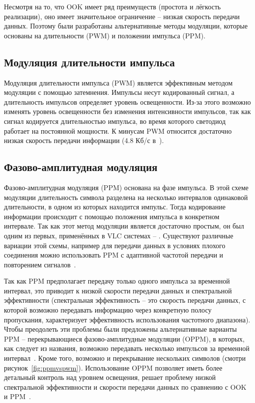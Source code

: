 Несмотря на то, что OOK имеет ряд преимуществ (простота и лёгкость реализации), оно имеет значительное ограничение \--- низкая скорость передачи данных. Поэтому были разработаны альтернативные методы модуляции, которые основаны на длительности (PWM) и положении импульса (PPM). 

\subsection{Модуляция длительности импульса}
\label{PWM}

Модуляция длительности импульса (PWM) является эффективным методом модуляции с помощью затемнения. Импульсы несут кодированный сигнал, а длительность импульсов определяет уровень освещенности. Из-за этого возможно изменять уровень освещенности без изменения интенсивности импульсов, так как сигнал кодируется длительностью импульса, во время которого светодиод работает на постоянной мощности. К минусам PWM относится достаточно низкая скорость передачи информации (4.8 Кб/с в~\cite{Sugiyama2007}).

\subsection{Фазово-амплитудная модуляция}

Фазово-амплитудная модуляция (PPM) основана на фазе импульса. В этой схеме модуляции длительность символа разделена на несколько интервалов одинаковой длительности, в одном из которых находится импульс. Тогда кодирование информации происходит с помощью положения импульса в конкретном интервале. Так как этот метод модуляции является достаточно простым, он был одним из первых, применённых в VLC системах \--- \cite{Georghiades1994,Shiu1999}. Существуют различные вариации этой схемы, например для передачи данных в условиях плохого соединения можно использовать PPM с адаптивной частотой передачи и повторением сигналов~\cite{Gfeller1996}.



Так как PPM предполагает передачу только одного импульса за временной интервал, это приводит к низкой скорости передачи данных и спектральной эффективности (спектральная эффективность \--- это скорость передачи данных, с которой возможно передавать информацию через конкретную полосу пропускания, характеризует эффективность использования частотного диапазона). Чтобы преодолеть эти проблемы были предложены альтернативные варианты PPM \--- перекрывающиеся фазово-амплитудные модуляции (OPPM), в которых, как следует из названия, возможно передавать несколько импульсов за временной интервал~\cite{Shiu1999}. Кроме того, возможно и перекрывание нескольких символов (смотри рисунок~\ref{fig:ppmvspwm}). Использование OPPM позволяет иметь более детальный контроль над уровнем освещения, решает проблему низкой спектральной эффективности и скорости передачи данных по сравнению с OOK и PPM~\cite{BoBai2010}.

